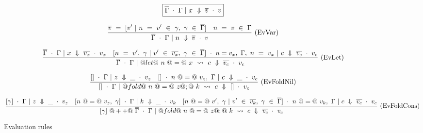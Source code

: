 
\begin{figure*}

$$
\boxed{\overline{\Gamma} ~\cdot~ \Gamma ~|~ x ~\Downarrow~ \overline{v} ~\cdot~ v}
$$


$$
\frac {\displaystyle 
    \overline{v} ~=~ [ v' ~|~ n ~=~ v' ~\in~ \gamma,~ \gamma ~\in~ \overline{\Gamma} ]
    \quad
    n ~=~ v ~\in~ \Gamma
} {\displaystyle  
    \overline{\Gamma} ~\cdot~ \Gamma ~|~ n ~\Downarrow~ \overline{v} ~\cdot~ v
} \ 
\textrm{(EvVar)}
$$

$$
\frac {\displaystyle 
    \overline{\Gamma} ~\cdot~ \Gamma ~|~ x ~\Downarrow~ \overline{v_x} ~\cdot~ v_x
    \quad
    [ n~=~v',~\gamma ~|~ v' ~\in~ \overline{v_x},~\gamma ~\in~ \overline{\Gamma}] ~\cdot~ n=v_x,~\Gamma,~n~=~v_x ~|~ c ~\Downarrow~ \overline{v_c} ~\cdot~ v_c
} {\displaystyle 
    \overline{\Gamma} ~\cdot~ \Gamma ~|~ @let@~n~@=@~x~\leadsto~c ~\Downarrow~ \overline{v_c} ~\cdot~ v_c
} \ 
\textrm{(EvLet)}
$$

$$
\frac {\displaystyle 
    [] ~\cdot~ \Gamma ~|~ z ~\Downarrow~ \_ ~\cdot~ v_z
    \quad
    [] ~\cdot~ n~@=@~v_z,~\Gamma ~|~ c ~\Downarrow~ \_ ~\cdot~ v_c
} {\displaystyle 
    [] ~\cdot~ \Gamma ~|~ @fold@~n~@=@~z@;@~k~\leadsto~c ~\Downarrow~ [] ~\cdot~ v_c
} \ 
\textrm{(EvFoldNil)}
$$

$$
\frac {\displaystyle 
    [\gamma] ~\cdot~ \Gamma ~|~ z ~\Downarrow~ \_ ~\cdot~ v_z
    \quad
    [n~@=@~v_z,~\gamma] ~\cdot~ \Gamma ~|~ k ~\Downarrow~ \_ ~\cdot~ v_k
    \quad
    [n~@=@~v',~\gamma ~|~ v' ~\in~ \overline{v_k},~ \gamma ~\in~ \overline{\Gamma} ] ~\cdot~ n~@=@~v_k,~\Gamma ~|~ c ~\Downarrow~ \overline{v_c} ~\cdot~ v_c
} {\displaystyle 
    [\gamma] ~@++@~ \overline{\Gamma} ~\cdot~ \Gamma ~|~ @fold@~n~@=@~z@;@~k~\leadsto~c ~\Downarrow~ \overline{v_c} ~\cdot~ v_c
} \ 
\textrm{(EvFoldCons)}
$$

\caption{Evaluation rules}
\label{fig:source:eval}
\end{figure*}



